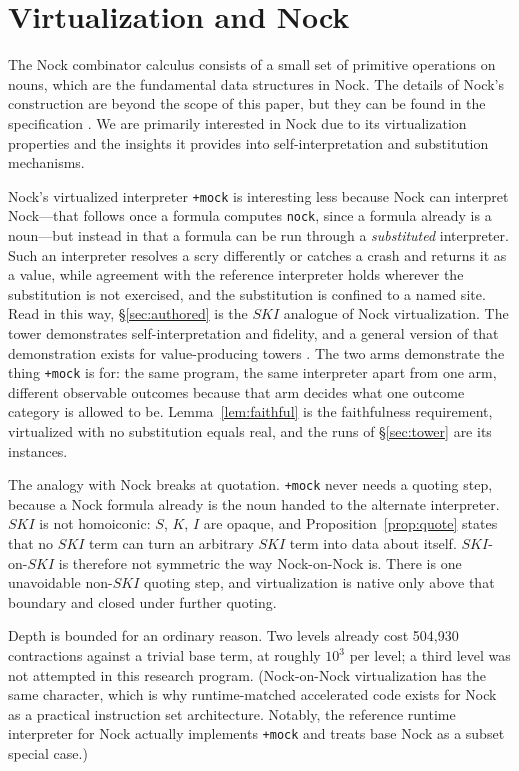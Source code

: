\documentclass[review]{jfp-epi}
\begin{document}
\section{Virtualization and Nock}\label{sec:mock}

The Nock combinator calculus consists of a small set of primitive
operations on nouns, which are the fundamental data structures in Nock.
The details of Nock's construction are beyond the scope of this paper,
but they can be found in the specification \citep{Nock4K}.  We are
primarily interested in Nock due to its virtualization properties and
the insights it provides into self-interpretation and substitution
mechanisms.

Nock's virtualized interpreter \texttt{+mock} is interesting less
because Nock can interpret Nock---that follows once a formula computes
\texttt{nock}, since a formula already is a noun---but
instead in that a formula can be run through a
\emph{substituted} interpreter. Such an interpreter resolves a scry
differently or catches a crash and returns it as a value, while
agreement with the reference interpreter holds wherever the
substitution is not exercised,
and the substitution is confined to a named site. Read in this way,
\S\ref{sec:authored} is the $SKI$ analogue of Nock virtualization.
The tower demonstrates
self-interpretation and fidelity, and a general version of that
demonstration exists for value-producing towers
\citep[Props.~4.2 and~4.6]{AminRompf2018}. The two arms demonstrate
the thing \texttt{+mock} is for: the same program, the same interpreter
apart from one arm, different observable outcomes because that arm
decides what one outcome category is allowed to be.
Lemma~\ref{lem:faithful} is the faithfulness requirement, virtualized
with no substitution equals real, and the runs of \S\ref{sec:tower} are
its instances.

The analogy with Nock breaks at quotation. \texttt{+mock} never needs
a quoting step, because a Nock formula already is the noun handed to
the alternate interpreter. $SKI$ is not homoiconic: $S$, $K$, $I$ are
opaque, and Proposition~\ref{prop:quote} states that no $SKI$ term
can turn an arbitrary $SKI$ term into data about itself. $SKI$-on-$SKI$
is therefore not symmetric the way Nock-on-Nock is. There is one
unavoidable non-$SKI$ quoting step, and virtualization is native only
above that boundary and closed under further quoting.

Depth is bounded for an ordinary reason. Two levels already cost
504,930 contractions against a trivial base term, at roughly $10^3$
per level; a third level was not attempted in this research program.
(Nock-on-Nock virtualization has the same character, which is why
runtime-matched accelerated code exists for Nock as a practical
instruction set architecture.  Notably, the reference runtime
interpreter for Nock actually implements \texttt{+mock} and treats
base Nock as a subset special case.)
\end{document}
